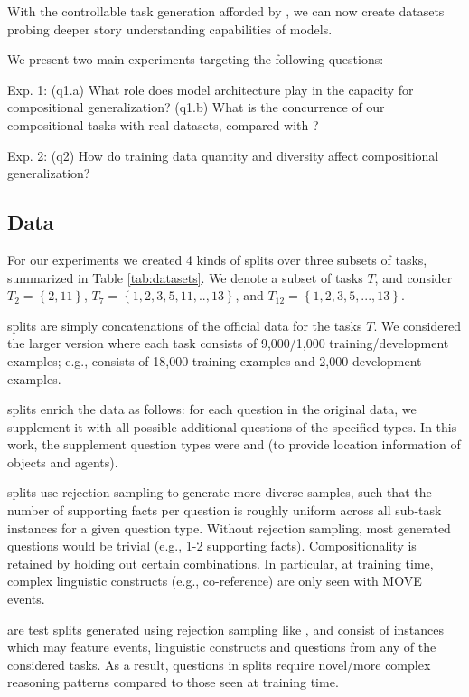 With the controllable task generation afforded by \pybabi, we can now create datasets probing deeper story understanding capabilities of models.


We present two main experiments targeting the following questions:
\begin{compactitem}
    \item Exp. 1: (q1.a) What role does model architecture play in the capacity for compositional generalization? (q1.b) What is the concurrence of our compositional tasks with real datasets, compared with \babibm? 
    \item Exp. 2: (q2) How do training data quantity and diversity affect compositional generalization?
\end{compactitem}
\subsection*{Data} 



For our experiments we created 4 kinds of splits over three subsets of \babibm tasks, summarized in Table \ref{tab:datasets}. We denote a subset of tasks $T$, and consider $T_2=\left\{ 2,11\right\} $, $T_7=\left\{1,2,3,5,11,..,13\right\}$, and $T_{12}=\left\{1,2,3,5,...,13\right\}$.
\begin{compactitem}
    \item \concatnarg splits are simply concatenations of the official data for the tasks $T$. We considered the larger version where each task consists of 9,000/1,000 training/development examples; e.g.,  consists of 18,000 training examples and 2,000 development examples.
    \item \injectnarg splits enrich the \concatnarg data as follows: for each question in the original data, we supplement it with all possible additional questions of the specified types. In this work, the supplement question types were \wherep and \whereo (to provide location information of objects and agents).
    \item \diversenarg splits use rejection sampling to generate more diverse samples, such that the number of supporting facts per question is roughly uniform across all sub-task instances for a given question type. Without rejection sampling, most generated questions would be trivial (e.g., 1-2 supporting facts). Compositionality is retained by holding out certain combinations. In particular, at training time, complex linguistic constructs (e.g., co-reference) are only seen with MOVE events.
    \item \mixnarg are test splits generated using rejection sampling like \diversenarg, and consist of instances which may feature events, linguistic constructs and questions from any of the considered tasks. As a result, questions in \mixnarg splits require novel/more complex reasoning patterns compared to those seen at training time.
\end{compactitem}


